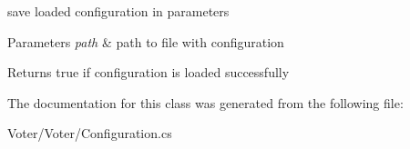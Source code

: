 save loaded configuration in parameters 


\begin{DoxyParams}{Parameters}
{\em path} & path to file with configuration\\
\hline
\end{DoxyParams}
\begin{DoxyReturn}{Returns}
true if configuration is loaded successfully
\end{DoxyReturn}


The documentation for this class was generated from the following file\+:\begin{DoxyCompactItemize}
\item 
Voter/\+Voter/Configuration.\+cs\end{DoxyCompactItemize}
